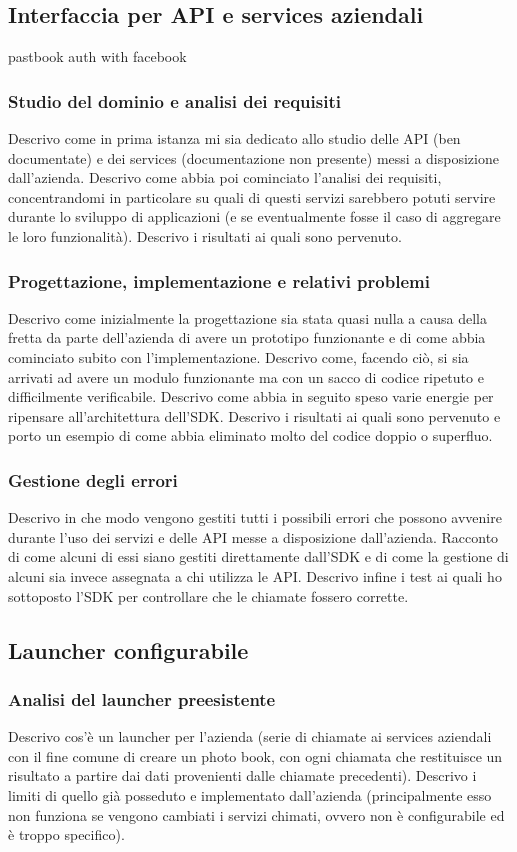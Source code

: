 		\subsection{Interfaccia per API e services aziendali}
			pastbook auth with facebook
			\subsubsection{Studio del dominio e analisi dei requisiti}
				Descrivo come in prima istanza mi sia dedicato allo studio delle API (ben documentate) e dei services (documentazione
				non presente) messi a disposizione dall'azienda. Descrivo come abbia poi cominciato l'analisi dei requisiti,
				concentrandomi in particolare su quali di questi servizi sarebbero potuti servire durante lo sviluppo di applicazioni
				(e se eventualmente fosse il caso di aggregare le loro funzionalità). Descrivo i risultati ai quali sono pervenuto.
			\subsubsection{Progettazione, implementazione e relativi problemi}
				Descrivo come inizialmente la progettazione sia stata quasi nulla a causa della fretta da parte dell'azienda di avere
				un prototipo funzionante e di come abbia cominciato subito con l'implementazione. Descrivo come, facendo ciò, si sia
				arrivati ad avere un modulo funzionante ma con un sacco di codice ripetuto e difficilmente verificabile. Descrivo
				come abbia in seguito speso varie energie per ripensare all'architettura dell'SDK. Descrivo i risultati ai quali sono
				pervenuto e porto un esempio di come abbia eliminato molto del codice doppio o superfluo.
			\subsubsection{Gestione degli errori}
				Descrivo in che modo vengono gestiti tutti i possibili errori che possono avvenire durante l'uso dei servizi e delle
				API messe a disposizione dall'azienda. Racconto di come alcuni di essi siano gestiti direttamente dall'SDK e di come
				la gestione di alcuni sia invece assegnata a chi utilizza le API. Descrivo infine i test ai quali ho sottoposto
				l'SDK per controllare che le chiamate fossero corrette.
		\subsection{Launcher configurabile}
			\subsubsection{Analisi del launcher preesistente}
				Descrivo cos'è un launcher per l'azienda (serie di chiamate ai services aziendali con il fine comune di creare un
				photo book, con ogni chiamata che restituisce un risultato a partire dai dati provenienti dalle chiamate precedenti).
				Descrivo i limiti di quello già posseduto e implementato dall'azienda (principalmente esso non funziona se vengono
				cambiati i servizi chimati, ovvero non è configurabile ed è troppo specifico).
